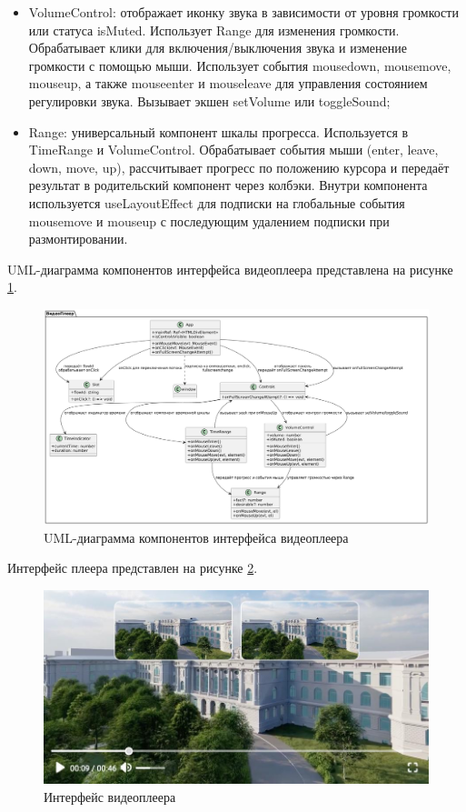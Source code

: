 \begin{itemize}[label=$\bullet$]
		\item VolumeControl: отображает иконку звука в зависимости от уровня громкости или статуса isMuted. Использует Range для изменения громкости. Обрабатывает клики для включения/выключения звука и изменение громкости с помощью мыши. Использует события mousedown, mousemove, mouseup, а также mouseenter и mouseleave для управления состоянием регулировки звука. Вызывает экшен setVolume или toggleSound;
		\item Range: универсальный компонент шкалы прогресса. Используется в TimeRange и VolumeControl. Обрабатывает события мыши (enter, leave, down, move, up), рассчитывает прогресс по положению курсора и передаёт результат в родительский компонент через колбэки. Внутри компонента используется useLayoutEffect для подписки на глобальные события mousemove и mouseup с последующим удалением подписки при размонтировании.
	\end{itemize}

	UML-диаграмма компонентов интерфейса видеоплеера представлена на рисунке \ref{fig:uml_player}.

	\begin{figure}[ht!] 
		\center
		\includegraphics [scale=0.24] {my_folder/images//uml_player}
		\caption{UML-диаграмма компонентов интерфейса видеоплеера} 
		\label{fig:uml_player}  
	\end{figure}

	Интерфейс плеера представлен на рисунке \ref{fig:player_interface}.

	\begin{figure}[ht!] 
		\center
		\includegraphics [scale=0.37] {my_folder/images//player_interface}
		\caption{Интерфейс видеоплеера} 
		\label{fig:player_interface}  
	\end{figure}

